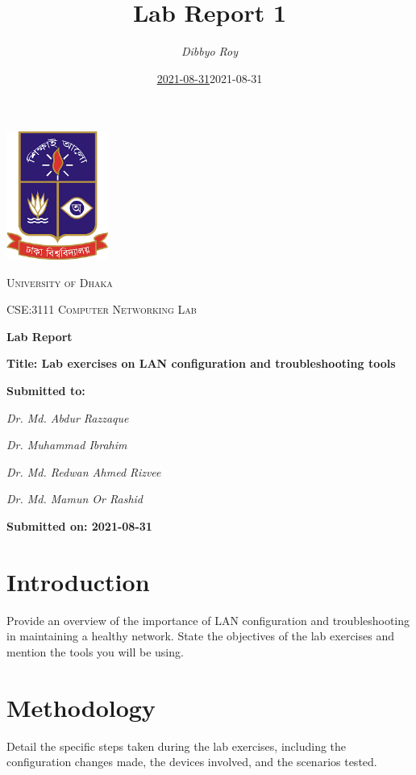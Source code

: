 \documentclass[12pt]{article}
\title{\textbf{Lab Report 1}}
\author{\textit{Dibbyo Roy}}
\date{\underline{2021-08-31}}
\date {2021-08-31 }
\begin{document}
\centering
\includegraphics[width=0.25\textwidth]{du.png}\par\vspace{1cm}
{\scshape\LARGE University of Dhaka \par}

\vfill
{\scshape\Large CSE:3111 Computer Networking Lab\par}

\vfill
{\huge\bfseries Lab Report\par}
\vfill
{\Large\textbf {
    Title: Lab exercises on LAN configuration and troubleshooting tools
}\par}

\vfill
{
}

\vfill
{\Large \textbf{ Submitted to:}\par}
{ \textit{Dr. Md. Abdur Razzaque}\par}
{ \textit{Dr. Muhammad Ibrahim}\par}
{ \textit{Dr. Md. Redwan Ahmed Rizvee}\par}
{ \textit{Dr. Md. Mamun Or Rashid}\par}

\vfill
{\Large\textbf {
    Submitted on: 2021-08-31
}\par}


\newpage 
\raggedright
\section*{Introduction}
Provide an overview of the importance of LAN configuration and troubleshooting in maintaining a healthy network. State the objectives of the lab exercises and mention the tools you will be using.
\vspace*{1\baselineskip}
\section*{Methodology}
Detail the specific steps taken during the lab exercises, including the configuration changes made, the devices involved, and the scenarios tested.
\vspace*{1\baselineskip}
\end{document}
